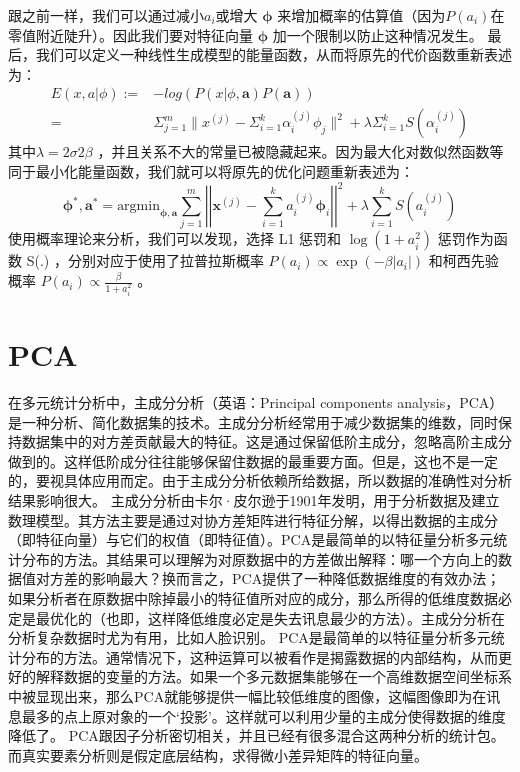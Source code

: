 跟之前一样，我们可以通过减小$a_i$或增大 $\mathbf{\phi}$ 来增加概率的估算值（因为$P(a_i)$在零值附近陡升）。因此我们要对特征向量 $\mathbf{\phi}$ 加一个限制以防止这种情况发生。
最后，我们可以定义一种线性生成模型的能量函数，从而将原先的代价函数重新表述为：
\begin{align}
E(x,a|\phi):=&-log(P(x|\phi,\mathbf{a})P(\mathbf{a}))\\
            =&\Sigma_{j=1}^m\|x^{(j)}-\Sigma_{i=1}^k\alpha_i^{(j)}\phi_j\|^2+\lambda\Sigma_{i=1}^{k}S(\alpha_i^{(j)})
\end{align}
其中$\lambda = 2\sigma2\beta$ ，并且关系不大的常量已被隐藏起来。因为最大化对数似然函数等同于最小化能量函数，我们就可以将原先的优化问题重新表述为：
\begin{equation}
\mathbf{\phi}^{*},\mathbf{a}^{*}=\text{argmin}_{\mathbf{\phi},\mathbf{a}} \sum_{j=1}^{m} \left|\left| \mathbf{x}^{(j)} - \sum_{i=1}^k a^{(j)}_i \mathbf{\phi}_{i}\right|\right|^{2} + \lambda \sum_{i=1}^{k}S(a^{(j)}_i) 
\end{equation}
使用概率理论来分析，我们可以发现，选择 L1 惩罚和 $\log(1+a_i^2)$ 惩罚作为函数 S(.) ，分别对应于使用了拉普拉斯概率 $P(a_i) \propto \exp\left(-\beta|a_i|\right)$ 和柯西先验概率 $P(a_i) \propto \frac{\beta}{1+a_i^2}$ 。
\section{PCA}
在多元统计分析中，主成分分析（英语：Principal components analysis，PCA）是一种分析、简化数据集的技术。主成分分析经常用于减少数据集的维数，同时保持数据集中的对方差贡献最大的特征。这是通过保留低阶主成分，忽略高阶主成分做到的。这样低阶成分往往能够保留住数据的最重要方面。但是，这也不是一定的，要视具体应用而定。由于主成分分析依赖所给数据，所以数据的准确性对分析结果影响很大。
主成分分析由卡尔·皮尔逊于1901年发明，用于分析数据及建立数理模型。其方法主要是通过对协方差矩阵进行特征分解，以得出数据的主成分（即特征向量）与它们的权值（即特征值）。PCA是最简单的以特征量分析多元统计分布的方法。其结果可以理解为对原数据中的方差做出解释：哪一个方向上的数据值对方差的影响最大？换而言之，PCA提供了一种降低数据维度的有效办法；如果分析者在原数据中除掉最小的特征值所对应的成分，那么所得的低维度数据必定是最优化的（也即，这样降低维度必定是失去讯息最少的方法）。主成分分析在分析复杂数据时尤为有用，比如人脸识别。
PCA是最简单的以特征量分析多元统计分布的方法。通常情况下，这种运算可以被看作是揭露数据的内部结构，从而更好的解释数据的变量的方法。如果一个多元数据集能够在一个高维数据空间坐标系中被显现出来，那么PCA就能够提供一幅比较低维度的图像，这幅图像即为在讯息最多的点上原对象的一个‘投影’。这样就可以利用少量的主成分使得数据的维度降低了。
PCA跟因子分析密切相关，并且已经有很多混合这两种分析的统计包。而真实要素分析则是假定底层结构，求得微小差异矩阵的特征向量。
